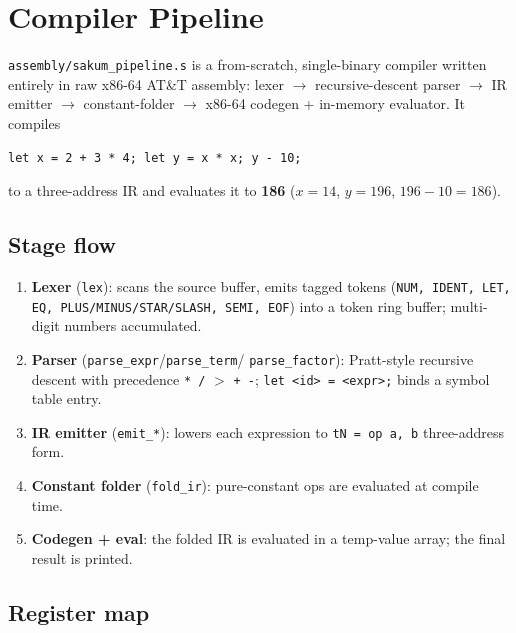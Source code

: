 \section{Compiler Pipeline}\label{ch:pipeline}

\texttt{assembly/sakum\_pipeline.s} is a from-scratch, single-binary
compiler written entirely in raw x86-64 AT\&T assembly: lexer $\to$
recursive-descent parser $\to$ IR emitter $\to$ constant-folder $\to$
x86-64 codegen + in-memory evaluator.  It compiles

\begin{verbatim}
let x = 2 + 3 * 4; let y = x * x; y - 10;
\end{verbatim}

to a three-address IR and evaluates it to \textbf{186} ($x=14$, $y=196$,
$196-10=186$).

\subsection{Stage flow}

\begin{enumerate}
  \item \textbf{Lexer} (\texttt{lex}): scans the source buffer, emits tagged
    tokens (\texttt{NUM, IDENT, LET, EQ, PLUS/MINUS/STAR/SLASH, SEMI, EOF})
    into a token ring buffer; multi-digit numbers accumulated.
  \item \textbf{Parser} (\texttt{parse\_expr}/\texttt{parse\_term}/
    \texttt{parse\_factor}): Pratt-style recursive descent with precedence
    \texttt{* /} $>$ \texttt{+ -}; \texttt{let <id> = <expr>;} binds a
    symbol table entry.
  \item \textbf{IR emitter} (\texttt{emit\_*}): lowers each expression to
    \texttt{tN = op a, b} three-address form.
  \item \textbf{Constant folder} (\texttt{fold\_ir}): pure-constant ops are
    evaluated at compile time.
  \item \textbf{Codegen + eval}: the folded IR is evaluated in a temp-value
    array; the final result is printed.
\end{enumerate}

\subsection{Register map}

